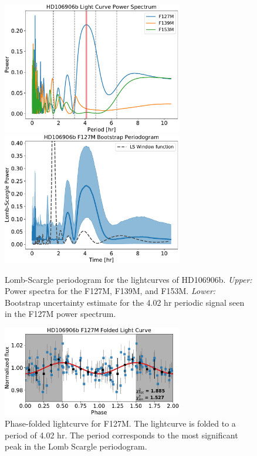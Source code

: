 \documentclass[twocolumn]{aastex62}
\begin{document}
\begin{figure}[!ht]
  \centering
  \includegraphics[width=0.7\textwidth]{figures/HD106906_powerspectrum.pdf} \includegraphics[width=0.7\textwidth]{figures/periodogram_bootstrap}
  \caption[Lomb-Scargle periodogram for the lightcurves of HD106906b.]{Lomb-Scargle periodogram for the lightcurves of HD106906b. \emph{Upper:} Power spectra for the F127M, F139M, and F153M. \emph{Lower:} Bootstrap uncertainty estimate for the 4.02 hr periodic signal seen in the F127M power spectrum. }
  \label{fig:periodogram}
\end{figure}

\begin{figure}[!ht]
  \centering
  \includegraphics[width=0.7\textwidth]{figures/F127M_foldedLC.pdf}
  \caption[Phase-folded lightcurve in the F127M filter for HD106906b.]{Phase-folded lightcurve for F127M. The lightcurve is folded to a period of 4.02 hr. The period corresponds to the most significant peak in the Lomb Scargle periodogram.}
  \label{fig:fold}
\end{figure}
\end{document}

